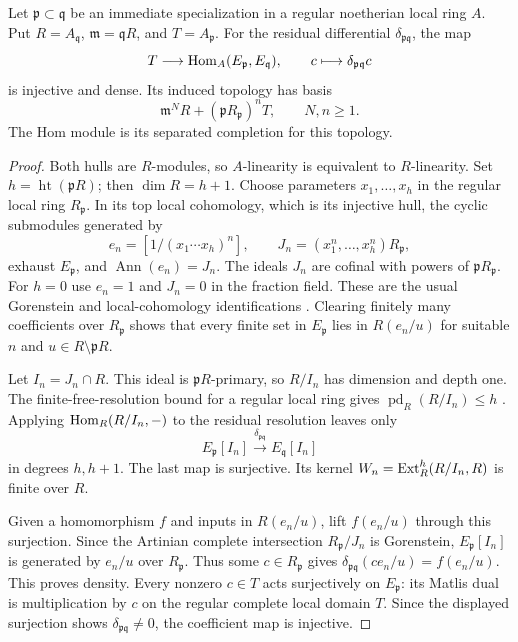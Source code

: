 \begin{proposition}\label{i:adjacent}
Let $\mathfrak p\subset\mathfrak q$ be an immediate specialization
in a regular noetherian local ring $A$. Put $R=A_{\mathfrak q}$,
$\mathfrak m=\mathfrak qR$, and $T=\widehat{A_{\mathfrak p}}$.
For the residual differential $\delta_{\mathfrak p\mathfrak q}$,
the map
\[
 T\longrightarrow\operatorname{Hom}_A(E_{\mathfrak p},E_{\mathfrak q}),
 \qquad c\longmapsto\delta_{\mathfrak p\mathfrak q}c
\]
is injective and dense. Its induced topology has basis
\[
 \mathfrak m^N R+(\mathfrak pR_{\mathfrak p})^n T,
 \qquad N,n\geq1.
\]
The Hom module is its separated completion for this topology.
\end{proposition}
\begin{proof}
Both hulls are $R$-modules, so $A$-linearity is equivalent to
$R$-linearity. Set $h=\operatorname{ht}(\mathfrak pR)$; then
$\dim R=h+1$. Choose parameters $x_1,\ldots,x_h$ in the regular
local ring $R_{\mathfrak p}$. In its top local cohomology,
which is its injective hull, the cyclic submodules generated by
\[
 e_n=[1/(x_1\cdots x_h)^n],\qquad
 J_n=(x_1^n,\ldots,x_h^n)R_{\mathfrak p},
\]
exhaust $E_{\mathfrak p}$, and $\operatorname{Ann}(e_n)=J_n$.
The ideals $J_n$ are cofinal with powers of $\mathfrak pR_{\mathfrak p}$.
For $h=0$ use $e_n=1$ and $J_n=0$ in the fraction field.
These are the usual Gorenstein and local-cohomology identifications
\cite[Lemmas 47.21.3, 47.21.7, and proof of 47.21.10]{StacksGorenstein}.
Clearing finitely many coefficients over $R_{\mathfrak p}$ shows
that every finite set in $E_{\mathfrak p}$ lies in
$R(e_n/u)$ for suitable $n$ and $u\in R\setminus\mathfrak pR$.

Let $I_n=J_n\cap R$. This ideal is $\mathfrak pR$-primary,
so $R/I_n$ has dimension and depth one. The finite-free-resolution
bound for a regular local ring gives
$\operatorname{pd}_R(R/I_n)\leq h$
\cite[Proposition 10.110.1]{StacksRegularResolution}.
Applying $\operatorname{Hom}_R(R/I_n,-)$ to the residual resolution leaves only
\[
 E_{\mathfrak p}[I_n]\xrightarrow{\delta_{\mathfrak p\mathfrak q}}
 E_{\mathfrak q}[I_n]
\]
in degrees $h,h+1$. The last map is surjective. Its kernel
$W_n=\operatorname{Ext}_R^h(R/I_n,R)$ is finite over $R$.

Given a homomorphism $f$ and inputs in $R(e_n/u)$, lift
$f(e_n/u)$ through this surjection. Since the Artinian complete
intersection $R_{\mathfrak p}/J_n$ is Gorenstein,
$E_{\mathfrak p}[I_n]$ is generated by $e_n/u$ over
$R_{\mathfrak p}$. Thus some $c\in R_{\mathfrak p}$ gives
$\delta_{\mathfrak p\mathfrak q}(ce_n/u)=f(e_n/u)$.
This proves density. Every nonzero $c\in T$ acts surjectively on
$E_{\mathfrak p}$: its Matlis dual is multiplication by $c$ on
the regular complete local domain $T$. Since the displayed
surjection shows $\delta_{\mathfrak p\mathfrak q}\ne0$, the
coefficient map is injective.


\end{proof}
